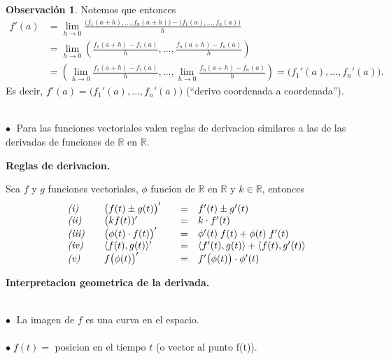 \documentclass{article}
\theoremstyle{definition}
\newtheorem*{obs}{Observación}
\theoremstyle{remark}
\newcommand\bl{$\bullet\;$}
\begin{document}
\begin{obs}
  Notemos que entonces \[ 
    \begin{aligned}
      f'(a) &= \lim_{h \to 0}{\frac{\big(f_1(a+h), \dots ,f_n(a+h)\big)-\big(f_1(a), \dots , f_n(a)\big)}{h}} \\
            &= \lim_{h \to 0}{\left(\frac{f_1(a+h)-f_1(a)}{h}, \dots , \frac{f_n(a+h)-f_n(a)}{h}\right)} \\
            &= \left(\lim_{h \to 0}{\frac{f_1(a+h)-f_1(a)}{h}}, \dots, \lim_{h \to 0}{\frac{f_n(a+h)-f_n(a)}{h}}\right)=\big(f_1'(a), \dots ,f_n'(a)\big).
    \end{aligned}
  \] Es decir, $f'(a)=\big(f_1'(a), \dots ,f_n'(a)\big)$ \quad \big(``derivo coordenada a coordenada''\big).
\end{obs}\; \\
 \textcolor{rojop2}{\bl} Para las funciones vectoriales valen reglas de derivacion similares a las de las derivadas de funciones de $\mathbb{R}$ en $\mathbb{R}$.
\begin{center}
\textbf{Reglas de derivacion.}
\end{center}
Sea $f$ y $g$ funciones vectoriales, $\phi$ funcion de $\mathbb{R}$ en $\mathbb{R}$ y $k \in \mathbb{R}$, entonces \[
  \begin{array}{lllllll}
 & \emph{(i)} & & \big(f(t) \pm g(t) \big)' &&=& f'(t)\pm g'(t)\\ 
 & \emph{(ii)} & & \big(k f(t))' &&=& k \cdot f'(t) \\
 & \emph{(iii)} & & \big(\phi(t)\cdot f(t)\big)' &&=& \phi'(t) \; f(t) + \phi(t) \; f'(t) \\
 & \emph{(iv)} & & \langle f(t),g(t) \rangle' &&=& \langle f'(t),g(t)\rangle + \langle f(t), g'(t) \rangle \\ 
 & \emph{(v)} & & f\big(\phi(t)\big)' &&= & f'\big(\phi(t)\big) \cdot \phi'(t)
\end{array}
\]
 \begin{center}
\textbf{Interpretacion geometrica de la derivada.}
\end{center}
\begin{figure}[h]
\centering
\def\svgwidth{1\textwidth}

\end{figure}
\; \\ 
\textcolor{rojop2}{\bl} La imagen de $f$ es una curva en el espacio. \\\\
\quad \bl $f(t) =$ posicion en el tiempo $t$ \big(o vector al punto f(t)\big). \\\\
\end{document}
